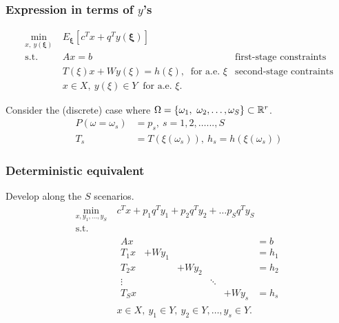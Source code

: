 \documentclass{beamer}
\def\bxi{\boldsymbol\xi}
\def\bxi{\boldsymbol\xi}
\begin{document}
\begin{frame}
	\frametitle{Expression in terms of $y$'s}
	
	\begin{align*}
	\min_{x,\ y(\bxi)}\ & E_{\bxi} [ c^T x + q^T y(\bxi) ] \\
	\mbox{s.t. } & Ax = b & \mbox{first-stage constraints} \\
	& T(\xi)x + Wy(\xi) = h(\xi),\ \text{ for a.e. } \xi &
	\mbox{second-stage contraints} \\
	& x \in X,\ y(\xi) \in Y\ \text{ for a.e. } \xi.
	\end{align*}
	
	Consider the (discrete) case where $\Omega = \lbrace \omega_1,\
	\omega_2,\ldots,\omega_S \rbrace \subset {\mathbb{R}}^r$.
	\begin{align*}
	P(\omega = \omega_s) & = p_s,\ s = 1, 2,\ldots . . . , S \\
	T_s & = T (\xi(\omega_s)),\ h_s = h(\xi(\omega_s)) 
	\end{align*}
	
\end{frame}

\begin{frame}
	\frametitle{Deterministic equivalent}
	
	Develop along the $S$ scenarios.
	\begin{align*}
	\min_{x, y_1, \ldots, y_S}\ & c^T x + p_1 q^T y_1 + p_2 q^T y_2 + \ldots
	p_S q^Ty_S \\
	\mbox{s.t. } & \\
	& \begin{matrix} Ax & & & & & = b\\
	T_1 x & + W y_1 & & & & = h_1 \\
	T_2 x & & + W y_2 & & & = h_2 \\
	\vdots & & & \ddots & \\
	T_S x & & & & + W y_s & = h_s
	\end{matrix} \\
	& x \in X,\ y_1 \in Y,\ y_2 \in Y,\ldots, y_s \in Y.
	\end{align*}
	
\end{frame}
\end{document}
